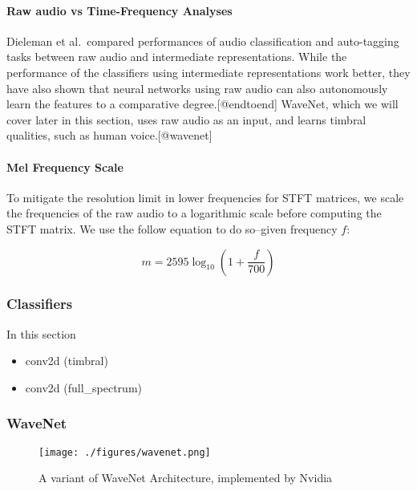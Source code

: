 \documentclass[]{article}
\providecommand{\tightlist}{%
  \setlength{\itemsep}{0pt}\setlength{\parskip}{0pt}}
\begin{document}
\paragraph{Raw audio vs Time-Frequency Analyses}

Dieleman et al.~compared performances of audio classification and
auto-tagging tasks between raw audio and intermediate representations.
While the performance of the classifiers using intermediate
representations work better, they have also shown that neural networks
using raw audio can also autonomously learn the features to a
comparative degree.{[}@endtoend{]} WaveNet, which we will cover later in
this section, uses raw audio as an input, and learns timbral qualities,
such as human voice.{[}@wavenet{]}

\paragraph{Mel Frequency Scale}

To mitigate the resolution limit in lower frequencies for STFT matrices,
we scale the frequencies of the raw audio to a logarithmic scale before
computing the STFT matrix. We use the follow equation to do so--given
frequency \(f\):

\begin{equation}
    m = 2595 \log_{10} (1 + \frac{f}{700})
\end{equation}

\hypertarget{classifiers}{%
\subsubsection{Classifiers}\label{classifiers}}

In this section

\begin{itemize}
\tightlist
\item
  conv2d (timbral)
\item
  conv2d (full\_spectrum)
\end{itemize}

\hypertarget{wavenet}{%
\subsubsection{WaveNet}\label{wavenet}}

\begin{figure}[!h]
    \texttt{[image: ./figures/wavenet.png]}
\centering
\caption{A variant of WaveNet Architecture, implemented by Nvidia}
\end{figure}
\end{document}

